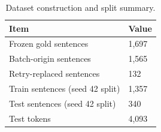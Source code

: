 \begin{table}[H]
\centering
\caption{Dataset construction and split summary.}
\label{tab:dataset_split}
\begin{tabular}{ll}
\toprule
Item & Value \\
\midrule
Frozen gold sentences & 1,697 \\
Batch-origin sentences & 1,565 \\
Retry-replaced sentences & 132 \\
Train sentences (seed 42 split) & 1,357 \\
Test sentences (seed 42 split) & 340 \\
Test tokens & 4,093 \\
\bottomrule
\end{tabular}
\end{table}
